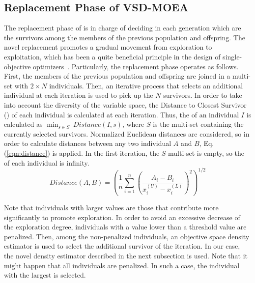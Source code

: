 \subsection{Replacement Phase of VSD-MOEA}

The replacement phase of \EAS{} is in charge of deciding in each generation which are the survivors 
among the members of the previous population and offspring.
%
The novel replacement promotes a gradual movement from exploration to exploitation, which has been a quite 
beneficial principle in the design of single-objective optimizers~\cite{Joel:MULTI_DYNAMIC}.
%
Particularly, the replacement phase operates as follows.
%
First, the members of the previous population and offspring are joined in a multi-set with $2 \times N$ individuals.
%
%
%
Then, an iterative process that selects an additional
individual at each iteration is used to pick up the $N$ survivors. 
%
In order to take into account the diversity of the variable space, the Distance to Closest Survivor (\DCS{}) of each
individual is calculated at each iteration.
%
Thus, the \DCS{} of an individual $I$ is calculated as $\displaystyle{\min_{s \in S}\ Distance(I, s)}$,
where $S$ is the multi-set containing the currently selected survivors. 
%
Normalized Euclidean distances are considered, so in order to calculate distances between any two individual $A$ and $B$, 
Eq. (\ref{eqn:distance}) is applied.
%
In the first iteration, the $S$ multi-set is empty, so the \DCS{} of each individual is infinity.
%
\begin{equation}\label{eqn:distance}
Distance(A, B) =   \left ( \frac{1}{n}  \sum_{i=1}^n \left ( \frac{A_i - B_i}{x_i^{(U)} - x_i^{(L)}} \right )^2  \right)^{1/2}
\end{equation}

Note that individuals with larger \DCS{} values are those that contribute more significantly to promote exploration.
%
In order to avoid an excessive decrease of the exploration degree, individuals with a \DCS{} value lower 
than a threshold value are penalized.
%
Then, among the non-penalized individuals, an objective space density estimator is used to select the additional
survivor of the iteration.
%
In our case, the novel density estimator described in the next subsection is used. 
%
Note that it might happen that all individuals are penalized.
%
In such a case, the individual with the largest \DCS{} is selected.

